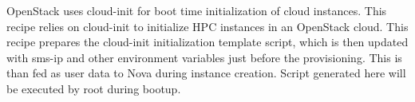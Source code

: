 	OpenStack uses cloud-init for boot time initialization of cloud instances. This recipe relies on cloud-init to initialize HPC instances in an OpenStack cloud. This recipe prepares the cloud-init initialization template script, which is then updated with sms-ip and other environment variables just before the provisioning. This is than fed as user data to Nova during instance creation. Script generated here will be executed by root during bootup.